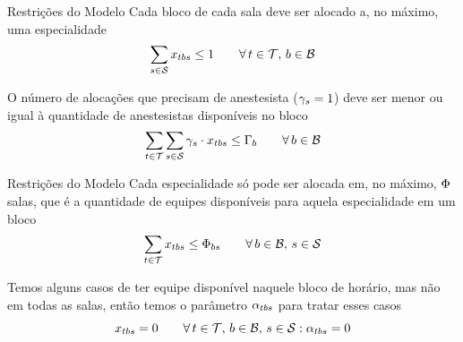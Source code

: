 \documentclass[10pt]{beamer}
\begin{document}
\begin{frame}{Restrições do Modelo}
    Cada bloco de cada sala deve ser alocado a, no máximo, uma especialidade
    \begin{equation}
    \label{eq:m2-4}
        \sum_{s \in \mathcal{S}} x_{tbs} \leq 1 \hspace{2em} \forall\, t \in \mathcal{T},\, b \in \mathcal{B}
    \end{equation}
    \vspace{2em}

    O número de alocações que precisam de anestesista ($\gamma_s = 1$) deve ser menor ou igual à quantidade de anestesistas disponíveis no bloco
    \begin{equation}
    \label{eq:m2-5}
        \sum_{t \in \mathcal{T}} \sum_{s \in \mathcal{S}} \gamma_{s} \cdot x_{tbs} \leq \Gamma_{b} \hspace{2em} \forall\, b \in \mathcal{B}
    \end{equation}
\end{frame}


\begin{frame}{Restrições do Modelo}
    Cada especialidade só pode ser alocada em, no máximo, $\Phi$ salas, que é a quantidade de equipes disponíveis para aquela especialidade em um bloco
    \begin{equation}
    \label{eq:m2-6}
        \sum_{t \in \mathcal{T}} x_{tbs} \leq \Phi_{bs} \hspace{2em} \forall\, b \in \mathcal{B},\, s \in \mathcal{S}
    \end{equation}
    \vspace{2em}

    Temos alguns casos de ter equipe disponível naquele bloco de horário, mas não em todas as salas, então temos o parâmetro $\alpha_{tbs}$ para tratar esses casos
    \begin{equation}
    \label{eq:m2-7}
        x_{tbs} = 0 \hspace{2em} \forall\, t \in \mathcal{T},\,b \in \mathcal{B},\, s \in \mathcal{S} : \alpha_{tbs} = 0
    \end{equation}
\end{frame}
   
\end{document}
